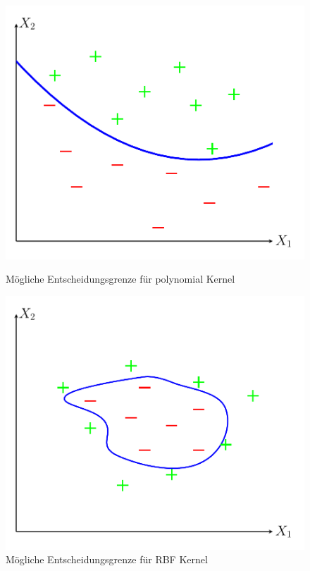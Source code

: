 \documentclass[
]{article}
\begin{document}
\begin{figure}[H]
    \centering
    \begin{minipage}{0.45\textwidth} 
        \centering
        \includegraphics[width=\textwidth,trim=0.5cm 0.5cm 0.5cm 0.5cm]{Images/ploynomial kernel.pdf} 
        \caption{Mögliche Entscheidungsgrenze für polynomial Kernel}
        \label{fig:polykernel}
    \end{minipage}\hfill
    \begin{minipage}{0.45\textwidth} 
        \centering
        \includegraphics[width=\textwidth,trim=0.5cm 0.5cm 0.5cm 0.5cm]{Images/radial_kernel.pdf}
        \caption{Mögliche Entscheidungsgrenze für RBF Kernel}
        \label{fig:radialkernel}
    \end{minipage}
\end{figure}
\end{document}

